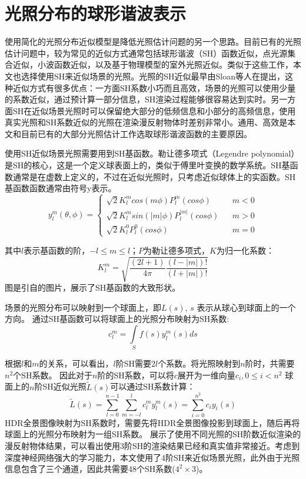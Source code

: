 \section{光照分布的球形谐波表示}
使用简化的光照分布近似模型是降低光照估计问题的另一个思路。目前已有的光照估计问题中，较为常见的近似方式通常包括球形谐波（SH）函数近似，点光源集合近似，小波函数近似，以及基于物理模型的室外光照近似。类似于这些工作，本文也选择使用SH来近似场景的光照。光照的SH近似最早由Sloan等人在\cite{sloan2002precomputed}提出，这种近似方式有很多优点：一方面SH系数小巧而且高效，场景的光照可以使用少量的系数近似，通过预计算一部分信息，SH渲染过程能够很容易达到实时。另一方面SH在近似场景光照时可以保留绝大部分的低频信息和小部分的高频信息，使用真实光照和SH系数近似的光照在渲染漫反射物体时差别非常小。通用、高效是本文和目前已有的大部分光照估计工作选取球形谐波函数的主要原因。

使用SH近似场景光照需要用到SH基函数。勒让德多项式（Legendre polynomial）是SH的核心，这是一个定义球表面上的，类似于傅里叶变换的数学系统。SH基函数通常是在虚数上定义的，不过在近似光照时，只考虑近似球体上的实函数。SH基函数函数通常由符号y表示。
\begin{equation}
y^m_l(\theta, \phi)=\left\{
    \begin{array}{lcl}
        \sqrt{2}K^m_lcos(m\phi)P^m_l(cos\phi) & & {m<0}\\
        \sqrt{2}K^m_lsin(|m|\phi)P^|m|_l(cos\phi) & & {m>0}\\
        \sqrt{2}K^0_lP^0_l(cos\phi) & & {m=0}
    \end{array} \right. 
\end{equation}

其中$l$表示基函数的阶，$-l \leq m \leq l$；$P$为勒让德多项式，$K$为归一化系数：
\begin{equation}
    K^m_l=\sqrt{\frac{(2l+1)}{4\pi}\frac{(l-|m|)!}{(l+|m|)!}}
\end{equation}
图是引自\cite{green2003spherical}的图片，展示了SH基函数的大致形状。

场景的光照分布可以映射到一个球面上，即$L(s)$, $s$ 表示从球心到球面上的一个方向。
通过SH基函数可以将球面上的光照分布映射为SH系数:
\begin{equation}
    c^m_l = \int\limits_{S}f(s)y^m_l(s)ds
\end{equation}

根据$l$和$m$的关系，可以看出，$l$阶SH需要$2l$个系数。将光照映射到$n$阶时，共需要$n^2$个SH系数。
因此对于$n$阶的SH系数，可以将$c$展开为一维向量$c_i, 0 \leq i < n^2$
球面上的$n$阶SH近似光照$\tilde{L}(s)$可以通过SH系数计算：
\begin{equation}
    \tilde{L}(s)=\sum_{l=0}^{n-1}\sum_{m=-l}^{l}c^m_ly^m_l(s)=\sum_{i=0}^{n^2}c_iy_i(s)
\end{equation}
HDR全景图像映射为SH系数时，需要先将HDR全景图像投影到球面上，随后再将球面上的光照分布映射为一组SH系数。
展示了使用不同光照的SH阶数近似渲染的漫反射物体结果，可以看出使用3阶SH的渲染结果已经和真实值非常接近。考虑到深度神经网络强大的学习能力，本文使用了4阶SH来近似场景光照，此外由于光照信息包含了三个通道，因此共需要48个SH系数($4^2\times3$)。
